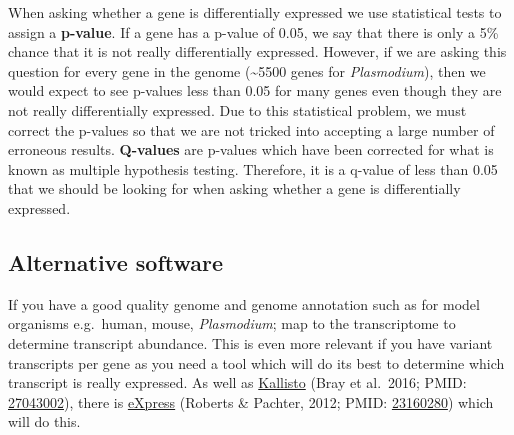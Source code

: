 \documentclass[11pt]{article}
\begin{document}
When asking whether a gene is differentially expressed we use
statistical tests to assign a \textbf{p-value}. If a gene has a p-value
of 0.05, we say that there is only a 5\% chance that it is not really
differentially expressed. However, if we are asking this question for
every gene in the genome (\textasciitilde5500 genes for
\textit{Plasmodium}), then we would expect to see p-values less than 0.05
for many genes even though they are not really differentially expressed.
Due to this statistical problem, we must correct the p-values so that we
are not tricked into accepting a large number of erroneous results.
\textbf{Q-values} are p-values which have been corrected for what is
known as multiple hypothesis testing. Therefore, it is a q-value of less
than 0.05 that we should be looking for when asking whether a gene is
differentially expressed.

\hypertarget{alternative-software}{%
\subsection{Alternative software}\label{alternative-software}}

If you have a good quality genome and genome annotation such as for
model organisms e.g.~human, mouse, \textit{Plasmodium}; map to the
transcriptome to determine transcript abundance. This is even more
relevant if you have variant transcripts per gene as you need a tool
which will do its best to determine which transcript is really
expressed. As well as
\href{https://pachterlab.github.io/kallisto/}{Kallisto} (Bray et
al.~2016; PMID:
\href{https://www.ncbi.nlm.nih.gov/pubmed/27043002}{27043002}), there is
\href{https://pachterlab.github.io/eXpress/overview.html}{eXpress}
(Roberts \& Pachter, 2012; PMID:
\href{https://www.ncbi.nlm.nih.gov/pubmed/23160280}{23160280}) which
will do this.
\end{document}
